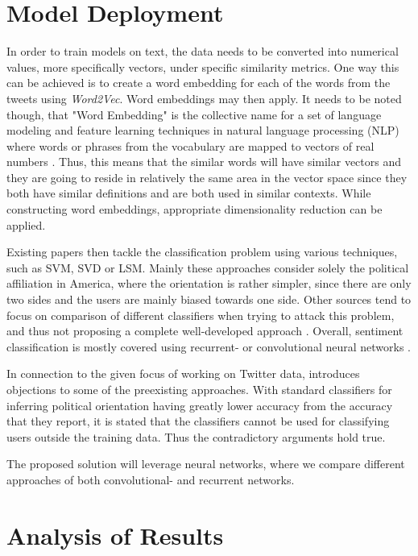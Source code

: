 \documentclass[10pt, oneside]{article}
\begin{document}
\begin{multicols}{2}
\section{Model Deployment}

In order to train models on text, the data needs to be converted into numerical values, more specifically vectors, under specific similarity metrics. One way this can be achieved is to create a word embedding for each of the words from the tweets using \textit{Word2Vec}.
Word embeddings may then apply. It needs to be noted though, that "Word Embedding" is the collective name for a set of language modeling and feature learning techniques in natural language processing (NLP) where words or phrases from the vocabulary are mapped to vectors of real numbers \cite{WikiWordEmbedding}. Thus, this means that the similar words will have similar vectors and they are going to reside in relatively the same area in the vector space since they both have similar definitions and are both used in similar contexts.
While constructing word embeddings, appropriate dimensionality reduction can be applied.

Existing papers \cite{Misra20XX} then tackle the classification problem using various techniques, such as SVM, SVD or LSM. Mainly these approaches consider solely the political affiliation in America, where the orientation is rather simpler, since there are only two sides and the users are mainly biased towards one side. 
Other sources tend to focus on comparison of different classifiers when trying to attack this problem, and thus not proposing a complete well-developed approach \cite{Bhanda2009}.
Overall, sentiment classification is mostly covered using recurrent- or convolutional neural networks \cite{Kim2014}.

In connection to the given focus of working on Twitter data, \cite{Cohen20XX} introduces objections to some of the preexisting approaches. With standard classifiers for inferring political orientation having greatly lower accuracy from the accuracy that they report, it is stated that the classifiers cannot be used for classifying users outside the training data. Thus the contradictory arguments hold true.

The proposed solution will leverage neural networks, where we compare different approaches of both convolutional- and recurrent networks.


\section{Analysis of Results}


\end{multicols}
\end{document}
